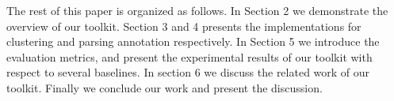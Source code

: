 The rest of this paper is organized as follows. In Section 2 we demonstrate the overview of our toolkit. Section 3 and 4 presents the implementations for clustering and parsing annotation respectively. In Section 5 we introduce the evaluation metrics, and present the experimental results of our toolkit with respect to several baselines. In section 6 we discuss the related work of our toolkit. Finally we conclude our work and present the discussion.








